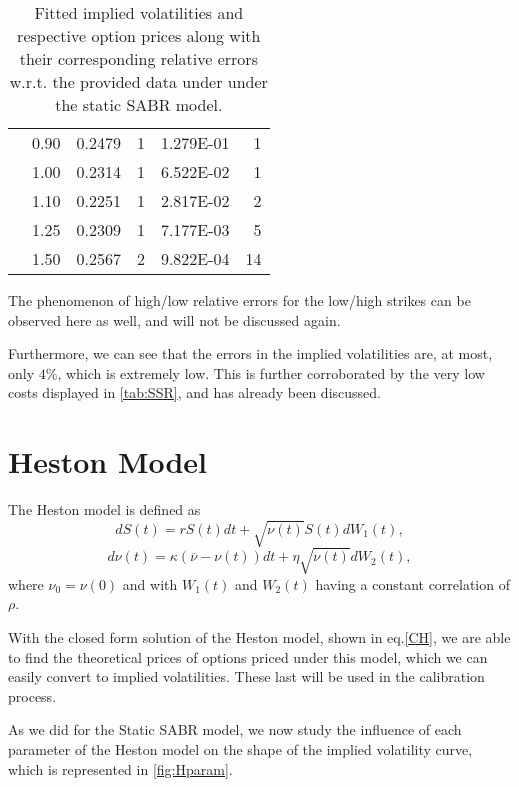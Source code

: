 \begin{table}[H]
\begin{tabular}{@{}cccrcr@{}}
 & 0.90 & 0.2479 & 1 & \num{1.279E-01} & 1 \\
 & 1.00 & 0.2314 & 1 & \num{6.522E-02} & 1 \\
 & 1.10 & 0.2251 & 1 & \num{2.817E-02} & 2 \\
 & 1.25 & 0.2309 & 1 & \num{7.177E-03} & 5 \\
 & 1.50 & 0.2567 & 2 & \num{9.822E-04} & 14 \\ \bottomrule
\end{tabular}
  \caption[Fitted implied volatilities and respective option prices along with their corresponding relative errors w.r.t. the provided data under under the static SABR model.]{Fitted implied volatilities and respective option prices along with their corresponding relative errors w.r.t. the provided data under under the static SABR model.}
  \label{tab:SS}
\end{table}

The phenomenon of high/low relative errors for the low/high strikes can be observed here as well, and will not be discussed again.

Furthermore, we can see that the errors in the implied volatilities are, at most, only $4\%$, which is extremely low. This is further corroborated by the very low costs displayed in \autoref{tab:SSR}, and has already been discussed.





\newpage
\section{Heston Model}
The Heston model is defined as
\begin{equation}
dS(t)=rS(t)dt+\sqrt{\nu(t)}S(t)dW_1(t),
\end{equation}
\begin{equation}
d\nu(t)=\kappa(\overline{\nu}-\nu(t))dt+\eta\sqrt{\nu(t)}dW_2(t),
\end{equation}
\noindent where $\nu_0=\nu(0)$ and with $W_1(t)$ and $W_2(t)$ having a constant correlation of $\rho$.

With the closed form solution of the Heston model, shown in eq.\eqref{CH}, we are able to find the theoretical prices of options priced under this model, which we can easily convert to implied volatilities. These last will be used in the calibration process.

As we did for the Static SABR model, we now study the influence of each parameter of the Heston model on the shape of the implied volatility curve, which is represented in \autoref{fig:Hparam}.

